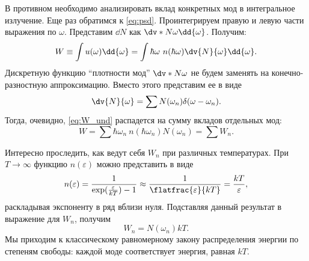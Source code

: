     В противном необходимо анализировать вклад конкретных мод в интегральное излучение. Еще раз обратимся к \autoref{eq:psd}. Проинтегрируем правую и левую части выражения по $\omega$. Представим $\dd{N}$ как $\dv*{N}{\omega}\dd{\omega}$. Получим:
    \begin{equation}\label{eq:W_und}
        W \equiv \int u(\omega) \dd{\omega} =
            \int \hbar\omega\ n(\hbar\omega) \dv{N}{\omega}\dd{\omega} .
    \end{equation}
    Дискретную функцию \enquote{плотности мод} $\dv*{N}{\omega}$ не будем заменять на конечно-разностную аппроксимацию. Вместо этого представим ее в виде
    \begin{equation}
        \dv{N}{\omega} = \sum N(\omega_n) \delta(\omega - \omega_n) .
    \end{equation}
    Тогда, очевидно, \autoref{eq:W_und} распадется на сумму вкладов отдельных мод:
    \begin{equation}\label{eq:W}
        W = \sum \hbar\omega_n\ n(\hbar\omega_n) N(\omega_n)
          = \sum W_n .
    \end{equation}

    Интересно проследить, как ведут себя $W_n$ при различных температурах. При $T \to \infty$ функцию $n(\varepsilon)$ можно представить в виде
    \begin{equation}
        n(\varepsilon)
            = \frac{1}{\exp(\frac{\varepsilon}{kT}) - 1}
            \approx \frac{1}{\flatfrac{\varepsilon}{kT}} = \frac{kT}{\varepsilon} ,
    \end{equation}
    раскладывая экспоненту в ряд вблизи нуля. Подставляя данный результат в выражение для $W_n$, получим
    \begin{equation}
        W_n = N(\omega_n) kT .
    \end{equation}
    Мы приходим к классическому равномерному закону распределения энергии по степеням свободы: каждой моде\footnotemark{} соответствует энергия, равная $kT$.


